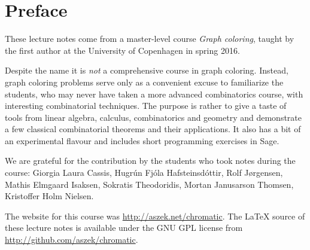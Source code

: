 \chapter{Preface}

These lecture notes come from a master-level course \emph{Graph coloring}, taught by the first author at the University of Copenhagen in spring 2016.

Despite the name it is \emph{not} a comprehensive course in graph coloring. Instead, graph coloring problems serve only as a convenient excuse to familiarize the students, who may never have taken a more advanced combinatorics course, with interesting combinatorial techniques. The purpose is rather to give a taste of tools from linear algebra, calculus, combinatorics and geometry and demonstrate a few classical combinatorial theorems and their applications. It also has a bit of an experimental flavour and includes short programming exercises in Sage.

We are grateful for the contribution by the students who took notes during the course: Giorgia Laura Cassis, Hugr\'un Fj\'ola Hafsteinsd\'ottir, Rolf J{\o}rgensen, Mathis Elmgaard Isaksen, Sokratis Theodoridis, Mortan Janusarson Thomsen, Kristoffer Holm Nielsen.

The website for this course was \url{http://aszek.net/chromatic}. The LaTeX source of these lecture notes is available under the GNU GPL license from \url{http://github.com/aszek/chromatic}.